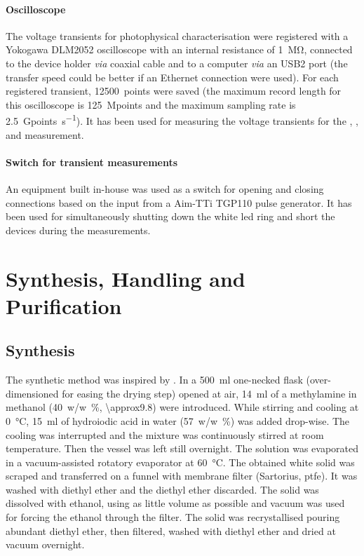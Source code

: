 		\paragraph{Oscilloscope}
		The voltage transients for photophysical characterisation were registered with a Yokogawa DLM2052 oscilloscope with an internal resistance of \SI{1}{\mega\ohm}, connected to the device holder \textsl{via} coaxial cable and to a computer \textsl{via} an USB2 port (the transfer speed could be better if an Ethernet connection were used).
		For each registered transient, \SI{12500}{points} were saved (the maximum record length for this oscilloscope is \SI{125}{Mpoints} and the maximum sampling rate is \SI{2.5}{Gpoints\per\s}).
		It has been used for measuring the voltage transients for the , , and  measurement.

		\paragraph{Switch for transient measurements}
		An equipment built in-house was used as a switch for opening and closing connections based on the input from a Aim-TTi TGP110 pulse generator.
		It has been used for simultaneously shutting down the white \gls{led} ring and short the devices during the  measurements.


\section{Synthesis, Handling and Purification}

	\subsection{ Synthesis}\label{methods-MAI}



		The synthetic method was inspired by \cite{Im2011a}.
		In a \SI{500}{\ml} one-necked flask (over-dimensioned for easing the drying step) opened at air, \SI{14}{\ml} of a methylamine in methanol (\SI{40}{w/w\%}, \SI{\approx9.8}{\Molar}) were introduced.
		While stirring and cooling at \SI{0}{\celsius}, \SI{15}{\ml} of hydroiodic acid in water (\SI{57}{w/w\%}) was added drop-wise.
		The cooling was interrupted and the mixture was continuously stirred at room temperature.
		Then the vessel was left still overnight.
		The solution was evaporated in a vacuum-assisted rotatory evaporator at \SI{60}{\celsius}.
		The obtained white solid was scraped and transferred on a funnel with membrane filter (Sartorius, \gls{ptfe}).
		It was washed with diethyl ether and the diethyl ether discarded.
		The solid was dissolved with ethanol, using as little volume as possible and vacuum was used for forcing the ethanol through the filter.
		The solid was recrystallised pouring abundant diethyl ether, then filtered, washed with diethyl ether and dried at vacuum overnight.

